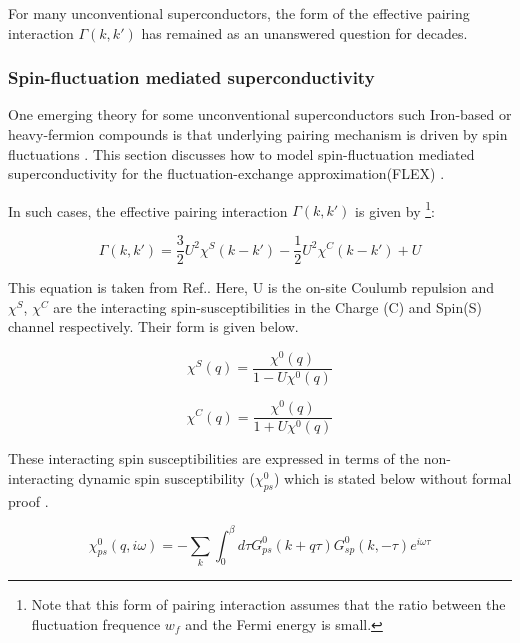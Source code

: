 \documentclass[12pt]{article}
\begin{document}
\noindent For many unconventional superconductors, the form of the effective pairing interaction $\Gamma(k,k')$ has remained as an unanswered question for decades.

\subsubsection{Spin-fluctuation mediated superconductivity}

One emerging theory for some unconventional superconductors such Iron-based or heavy-fermion compounds 
is that underlying pairing mechanism is driven by spin fluctuations \cite{moriya2000spin}. This section discusses how to
model spin-fluctuation mediated superconductivity for the fluctuation-exchange approximation(FLEX) \cite{esirgen1997fluctuation}. \par
\medskip
\noindent In such cases, the effective pairing interaction $\Gamma(k,k')$ is given by \footnote{Note that this form of pairing interaction 
assumes that the ratio between 
the fluctuation frequence $w_f$ and the Fermi energy is small.}:

\begin{equation}\label{Pairing interaction SF}
    \Gamma(k,k') = \frac{3}{2} U^2 \chi^S(k-k') -\frac{1}{2}U^2 \chi^C(k-k') + U
\end{equation} 

\noindent This equation is taken from Ref.\cite{migdal1958interaction}. Here, U is the on-site Coulumb repulsion and $\chi^S$, $\chi^C$ are the interacting spin-susceptibilities in the Charge (C) and Spin(S) channel respectively. Their form is given below.

\begin{equation}
    \chi^S(q) = \frac{\chi^0(q)}{1 - U \chi^0 (q)}
\end{equation}

\begin{equation}
    \chi^C(q) = \frac{\chi^0(q)}{1 + U \chi^0 (q)}
\end{equation}

\noindent These interacting spin susceptibilities are expressed in terms of the non-interacting dynamic spin susceptibility ($\chi_{ps}^0$) which is stated below without formal proof \cite{moriya2000spin}. 

\begin{equation}\label{chi 0}
    \chi_{ps}^0(q, i \omega) = -\sum_{k} \int_{0}^{\beta} d\tau G^0_{ps}(k+q \tau) G^0_{sp}(k, -\tau)e^{i\omega \tau}
\end{equation} 
\end{document}
